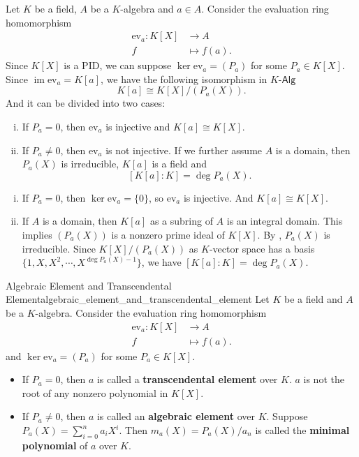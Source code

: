 \begin{proposition}{}{}
    Let $K$ be a field, $A$ be a $K$-algebra and $a\in A$. Consider the evaluation ring homomorphism
    \begin{align*}
        \mathrm{ev}_a:K[X] &\longrightarrow A\\
        f &\longmapsto f(a).
    \end{align*}
    Since $K[X]$ is a PID, we can suppose $\ker \mathrm{ev}_a=(P_a)$ for some $P_a\in K[X]$. Since $\operatorname{im}\mathrm{ev}_a=K[a]$, we have the following isomorphism in $K$-$\mathsf{Alg}$
    \[
        K[a]\cong K[X]/(P_a(X)).
    \]
    And it can be divided into two cases:
    \begin{enumerate}[(i)]
        \item If $P_a=0$, then $\mathrm{ev}_a$ is injective and $K[a]\cong K[X]$.
        \item If $P_a\ne 0$, then $\mathrm{ev}_a$ is not injective. If we further assume $A$ is a domain, then $P_a(X)$ is irreducible, $K[a]$ is a field and
        \[
        \left[ K[a]:K \right]=\deg P_a(X).
        \]
    \end{enumerate}
\end{proposition}
\begin{prf}
    \begin{enumerate}[(i)]
        \item If $P_a=0$, then $\ker \mathrm{ev}_a=\{0\}$, so $\mathrm{ev}_a$ is injective. And $K[a]\cong K[X]$.
        \item If $A$ is a domain, then $K[a]$ as a subring of $A$ is an integral domain. This implies $(P_a(X))$ is a nonzero prime ideal of $K[X]$. By , $P_a(X)$ is irreducible. Since $K[X]/(P_a(X))$ as $K$-vector space has a basis $\{1,X,X^2,\cdots,X^{\deg P_a(X)-1}\}$, we have $\left[ K[a]:K \right]=\deg P_a(X)$.
    \end{enumerate}
   
\end{prf}

\begin{definition}{Algebraic Element and Transcendental Element}{algebraic_element_and_transcendental_element}
    Let $K$ be a field and $A$ be a $K$-algebra. Consider the evaluation ring homomorphism
    \begin{align*}
        \mathrm{ev}_a:K[X] &\longrightarrow A\\
        f &\longmapsto f(a).
    \end{align*}
    and $\ker \mathrm{ev}_a=(P_a)$ for some $P_a\in K[X]$.
    \begin{itemize}
        \item If $P_a=0$, then $a$ is called a \textbf{transcendental element} over $K$. $a$ is not the root of any nonzero polynomial in $K[X]$. 
        \item If $P_a\ne 0$, then $a$ is called an \textbf{algebraic element} over $K$. Suppose $P_a(X)=\sum_{i=0}^n a_iX^i$. Then $m_a(X)=P_a(X)/a_n$ is called the \textbf{minimal polynomial} of $a$ over $K$.
    \end{itemize}
\end{definition}

